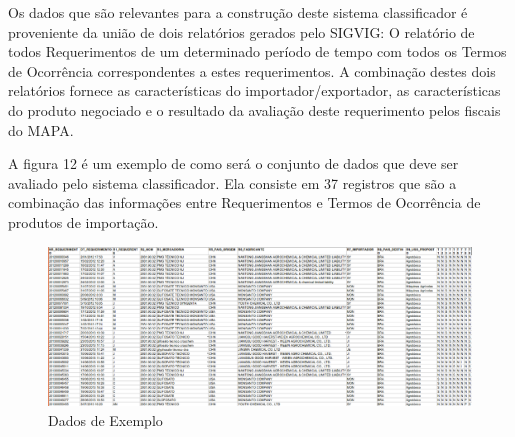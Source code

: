 Os dados que são relevantes para a construção deste sistema classificador é proveniente da união de dois relatórios gerados pelo SIGVIG: O relatório de todos Requerimentos de um determinado período de tempo com todos os Termos de Ocorrência correspondentes a estes requerimentos. A combinação destes dois relatórios fornece as características do importador/exportador, as características do produto negociado e o resultado da avaliação deste requerimento pelos fiscais do MAPA.

A figura 12 é um exemplo de como será o conjunto de dados que deve ser avaliado pelo sistema classificador. Ela consiste em 37 registros que são a combinação das informações entre Requerimentos e Termos de Ocorrência de produtos de importação.

\begin{figure}[!h]
\centering
\includegraphics[keepaspectratio=true,scale=0.40]
{figuras/tabelaMapa.eps}
\caption{Dados de Exemplo}
\label{tabelaMapa}
\end{figure}

